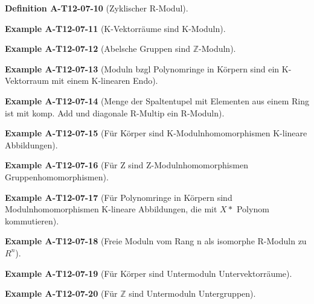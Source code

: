 \documentclass[10pt, letterpaper]{article}
\newcommand{\Z}{\mathbb{Z}}
\newcommand{\CustomHeading}[3]{%
  \par\medskip\noindent%
  \textbf{#1 #2} \textnormal{(#3)}.\enskip%
}
\newenvironment{DEF}[2]{\CustomHeading{Definition}{#1}{#2}}{}
\newenvironment{EXA}[2]{\CustomHeading{Example}{#1}{#2}}{}
\begin{document}
\begin{DEF}{A-T12-07-10}{Zyklischer R-Modul}
\end{DEF}

\begin{EXA}{A-T12-07-11}{K-Vektorräume sind K-Moduln}
\end{EXA}

\begin{EXA}{A-T12-07-12}{Abelsche Gruppen sind $\Z$-Moduln}
\end{EXA}

\begin{EXA}{A-T12-07-13}{Moduln bzgl Polynomringe in Körpern sind ein K-Vektorraum mit einem K-linearen Endo}
\end{EXA}

\begin{EXA}{A-T12-07-14}{Menge der Spaltentupel mit Elementen aus einem Ring ist mit komp. Add und diagonale R-Multip ein R-Moduln}
\end{EXA}

\begin{EXA}{A-T12-07-15}{Für Körper sind K-Modulnhomomorphismen K-lineare Abbildungen}
\end{EXA}

\begin{EXA}{A-T12-07-16}{Für Z sind Z-Modulnhomomorphismen Gruppenhomomorphismen}
\end{EXA}

\begin{EXA}{A-T12-07-17}{Für Polynomringe in Körpern sind Modulnhomomorphismen K-lineare Abbildungen, die mit $X*$ Polynom kommutieren}
\end{EXA}

\begin{EXA}{A-T12-07-18}{Freie Moduln vom Rang n als isomorphe R-Moduln zu $R^n$}
\end{EXA}

\begin{EXA}{A-T12-07-19}{Für Körper sind Untermoduln Untervektorräume}
\end{EXA}

\begin{EXA}{A-T12-07-20}{Für $\Z$ sind Untermoduln Untergruppen}
\end{EXA}
\end{document}
